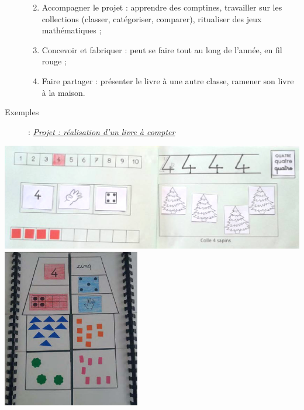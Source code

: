 \begin{exercice*}
\begin{description}
\begin{enumerate}
\begin{itemize}
         \end{itemize}
         \item Accompagner le projet : apprendre des comptines, travailler sur les collections (classer, catégoriser, comparer), ritualiser des jeux mathématiques ;
         \item Concevoir et fabriquer : peut se faire tout au long de l'année, en fil rouge ;
         \item Faire partager : présenter le livre à une autre classe, ramener son livre à la maison.
      \end{enumerate}
      \item[Exemples] : \href{http://maternelle27.spip.ac-rouen.fr/IMG/pdf/8._les_livres_acompter.pdf}{\it\blue Projet : réalisation d'un livre à compter}
   \end{description}
\end{exercice*}

\begin{center}
   \includegraphics[width=15cm]{Nombres_et_calculs_did/Images/Num3_activites_page_album} \\
   \includegraphics[width=6cm]{Nombres_et_calculs_did/Images/Num3_activites_album_calcul}
\end{center}


\bigskip

